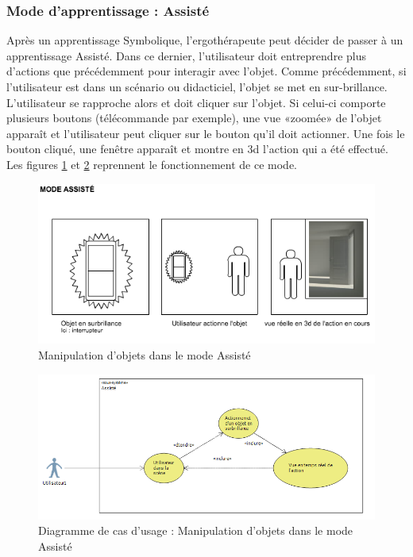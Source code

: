 \subsubsection{Mode d'apprentissage : Assisté}

Après un apprentissage Symbolique, l'ergothérapeute peut décider de passer à un apprentissage Assisté. Dans ce dernier, l'utilisateur doit entreprendre plus d'actions que précédemment pour interagir avec l'objet. Comme précédemment, si l'utilisateur est dans un scénario ou didacticiel, l'objet se met en sur-brillance. L'utilisateur se rapproche alors et doit cliquer sur l'objet. Si celui-ci comporte plusieurs boutons (télécommande par exemple), une vue «zoomée» de l'objet apparaît et l'utilisateur peut cliquer sur le bouton qu'il doit actionner. Une fois le bouton cliqué, une fenêtre apparaît et montre en 3d l'action qui a été effectué.
\newline
Les figures \ref{fig:MaquetteAssiste} et \ref{fig:CasUsageAssiste} reprennent le fonctionnement de ce mode.

\begin{figure}[h]
\centering
\includegraphics[width=1\textwidth]{2-Specifications/img-utilisateur/assiste.png}
\caption{\label{fig:MaquetteAssiste} Manipulation d'objets dans le mode Assisté }
\end{figure}
\begin{figure}[h]
\centering
\includegraphics[width=1\textwidth]{2-Specifications/img-utilisateur/cas-usage-assiste.png}
\caption{\label{fig:CasUsageAssiste} Diagramme de cas d'usage : Manipulation d'objets dans le mode Assisté }
\end{figure}
\FloatBarrier


